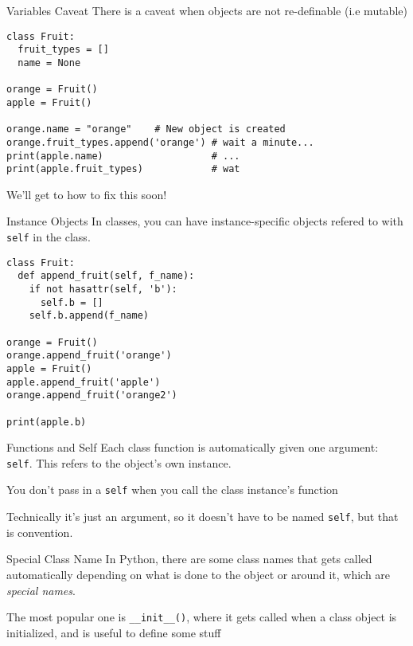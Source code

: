 \begin{frame}[containsverbatim]{Variables Caveat}
  There is a caveat when objects are not re-definable (i.e mutable)
\begin{verbatim}
class Fruit:
  fruit_types = []
  name = None

orange = Fruit()
apple = Fruit()

orange.name = "orange"    # New object is created
orange.fruit_types.append('orange') # wait a minute...
print(apple.name)                   # ...
print(apple.fruit_types)            # wat
\end{verbatim}
We'll get to how to fix this soon!
\end{frame}

\begin{frame}[containsverbatim]{Instance Objects}
  In classes, you can have instance-specific objects refered to with \verb|self| in the class.
\begin{verbatim}
class Fruit:
  def append_fruit(self, f_name):
    if not hasattr(self, 'b'):
      self.b = []
    self.b.append(f_name)

orange = Fruit()
orange.append_fruit('orange')
apple = Fruit()
apple.append_fruit('apple')
orange.append_fruit('orange2')

print(apple.b)
\end{verbatim}
\end{frame}

\begin{frame}[containsverbatim]{Functions and Self}
  Each class function is automatically given one argument: \verb|self|. This refers to the object's own instance.

  You don't pass in a \verb|self| when you call the class instance's function

  Technically it's just an argument, so it doesn't have to be named \verb|self|, but that is convention.
\end{frame}


\begin{frame}[containsverbatim]{Special Class Name}
  In Python, there are some class names that gets called automatically depending on what is done to the object or around it, which are \textit{special names}.

  The most popular one is \verb|__init__()|, where it gets called when a class object is initialized, and is useful to define some stuff
\end{frame}

